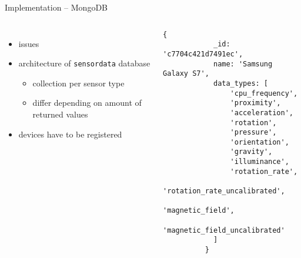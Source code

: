 \documentclass[aspectratio=1610]{beamer}
\begin{document}
  \begin{frame}[fragile]{Implementation -- MongoDB}
    \begin{columns}
        \begin{itemize}
          \item issues
          \item architecture of \texttt{sensordata} database
            \begin{itemize}
              \item collection per sensor type
              \item differ depending on amount of returned values
            \end{itemize}
          \item devices have to be registered
        \end{itemize}
          \begin{lstlisting}[language=mongo, basicstyle=\scriptsize\ttfamily]
          {
            _id: 'c7704c421d7491ec',
            name: 'Samsung Galaxy S7',
            data_types: [
                'cpu_frequency',
                'proximity',
                'acceleration',
                'rotation',
                'pressure',
                'orientation',
                'gravity',
                'illuminance',
                'rotation_rate',
                'rotation_rate_uncalibrated',
                'magnetic_field',
                'magnetic_field_uncalibrated'
            ]
          }
          \end{lstlisting}
     \end{columns}
  \end{frame}
\end{document}
